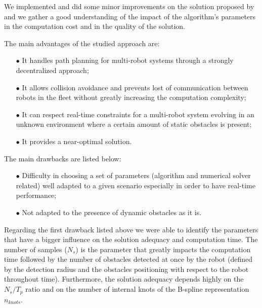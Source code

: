 We implemented and did some minor improvements on the solution proposed by \cite{Defoort2007a} and we gather a good understanding of the impact of the algorithm's parameters in the computation cost and in the quality of the solution.

The main advantages of the studied approach are:
\begin{itemize}
\item[$\bullet$] It handles path planning for multi-robot systems through a strongly decentralized approach;
\item[$\bullet$] It allows collision avoidance and prevents lost of communication between robots in the fleet without greatly increasing the computation complexity;
\item[$\bullet$] It can respect real-time constraints for a multi-robot system evolving in an unknown environment where a certain amount of static obstacles is present;
\item[$\bullet$] It provides a near-optimal solution.
\end{itemize}

The main drawbacks are listed below:
\begin{itemize}
\item[$\bullet$] Difficulty in choosing a set of parameters (algorithm and numerical solver related) well adapted to a given scenario especially in order to have real-time performance;
\item[$\bullet$] Not adapted to the presence of dynamic obstacles as it is.
\end{itemize}

%


Regarding the first drawback listed above we were able to identify the parameters that have a bigger influence on the solution adequacy and computation time. The number of samples ($N_s$) is the parameter that greatly impacts the computation time followed by the number of obstacles detected at once by the robot (defined by the detection radius and the obstacles positioning with respect to the robot throughout time). Furthermore, the solution adequacy depends highly on the $N_s/T_p$ ratio and on the number of internal knots of the B-spline representation $n_{knots}$.

